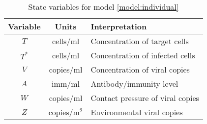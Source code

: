 \documentclass[11pt]{article}
\numberwithin{equation}{subsection}
\begin{document}
    \begin{table}[h!]
        \centering
        \caption{State variables for model \ref{model:individual}}
        \vspace{1em}
        \begin{tabular}{ccl} \hline\hline
            Variable    & Units     & Interpretation \\\hline\hline
            $T$         & cells/ml  & Concentration of target cells \\
            $T^*$       & cells/ml  & Concentration of infected cells \\
            $V$         & copies/ml & Concentration of viral copies \\
            $A$         & imm/ml    & Antibody/immunity level \\
            $W$         & copies/ml
                                    & Contact pressure of viral copies \\
            $Z$         & copies/m$^2$
                                    & Environmental viral copies \\
            \hline
        \end{tabular}
        \label{tab:state}
    \end{table}
\end{document}
